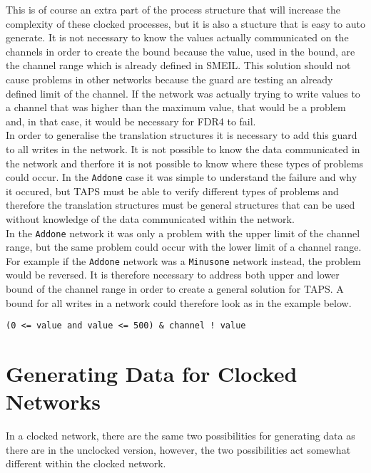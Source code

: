 This is of course an extra part of the process structure that will increase the complexity of these clocked processes, but it is also a stucture that is easy to auto generate. It is not necessary to know the values actually communicated on the channels in order to create the bound because the value, used in the bound, are the channel range which is already defined in SMEIL. This solution should not cause problems in other networks because the guard are testing an already defined limit of the channel. If the network was actually trying to write values to a channel that was higher than the maximum value, that would be a problem and, in that case, it would be necessary for FDR4 to fail. \\

In order to generalise the translation structures it is necessary to add this guard to all writes in the network. It is not possible to know the data communicated in the network and therfore it is not possible to know where these types of problems could occur. In the \texttt{Addone} case it was simple to understand the failure and why it occured, but TAPS must be able to verify different types of problems and therefore the translation structures must be general structures that can be used without knowledge of the data communicated within the network. \\

In the \texttt{Addone} network it was only a problem with the upper limit of the channel range, but the same problem could occur with the lower limit of a channel range. For example if the \texttt{Addone} network was a \texttt{Minusone} network instead, the problem would be reversed. It is therefore necessary to address both upper and lower bound of the channel range in order to create a general solution for TAPS. A bound for all writes in a network could therefore look as in the example below.
\begin{verbatim}
(0 <= value and value <= 500) & channel ! value
\end{verbatim}
\section{Generating Data for Clocked Networks}
In a clocked network, there are the same two possibilities for generating data as there are in the unclocked version, however, the two possibilities act somewhat different within the clocked network. \\

